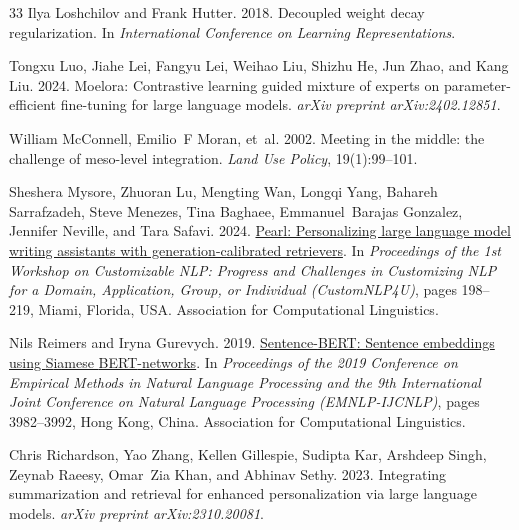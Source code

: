 \documentclass[11pt]{article}
\begin{document}
\begin{thebibliography}{33}
Ilya Loshchilov and Frank Hutter. 2018.
\newblock Decoupled weight decay regularization.
\newblock In \emph{International Conference on Learning Representations}.

Tongxu Luo, Jiahe Lei, Fangyu Lei, Weihao Liu, Shizhu He, Jun Zhao, and Kang Liu. 2024.
\newblock Moelora: Contrastive learning guided mixture of experts on parameter-efficient fine-tuning for large language models.
\newblock \emph{arXiv preprint arXiv:2402.12851}.

William McConnell, Emilio~F Moran, et~al. 2002.
\newblock Meeting in the middle: the challenge of meso-level integration.
\newblock \emph{Land Use Policy}, 19(1):99--101.

Sheshera Mysore, Zhuoran Lu, Mengting Wan, Longqi Yang, Bahareh Sarrafzadeh, Steve Menezes, Tina Baghaee, Emmanuel~Barajas Gonzalez, Jennifer Neville, and Tara Safavi. 2024.
\newblock \href {https://doi.org/10.18653/v1/2024.customnlp4u-1.16} {Pearl: Personalizing large language model writing assistants with generation-calibrated retrievers}.
\newblock In \emph{Proceedings of the 1st Workshop on Customizable NLP: Progress and Challenges in Customizing NLP for a Domain, Application, Group, or Individual (CustomNLP4U)}, pages 198--219, Miami, Florida, USA. Association for Computational Linguistics.

Nils Reimers and Iryna Gurevych. 2019.
\newblock \href {https://doi.org/10.18653/v1/D19-1410} {Sentence-{BERT}: Sentence embeddings using {S}iamese {BERT}-networks}.
\newblock In \emph{Proceedings of the 2019 Conference on Empirical Methods in Natural Language Processing and the 9th International Joint Conference on Natural Language Processing (EMNLP-IJCNLP)}, pages 3982--3992, Hong Kong, China. Association for Computational Linguistics.

Chris Richardson, Yao Zhang, Kellen Gillespie, Sudipta Kar, Arshdeep Singh, Zeynab Raeesy, Omar~Zia Khan, and Abhinav Sethy. 2023.
\newblock Integrating summarization and retrieval for enhanced personalization via large language models.
\newblock \emph{arXiv preprint arXiv:2310.20081}.


\end{thebibliography}
\end{document}

